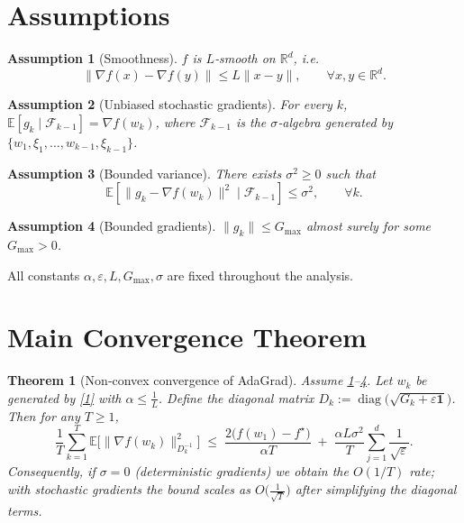 \documentclass{article}
\newtheorem{theorem}{Theorem}
\newtheorem{assumption}{Assumption}
\newcommand{\E}{\mathbb{E}}
\newcommand{\R}{\mathbb{R}}
\begin{document}
\newpage
\section*{Assumptions}
\begin{assumption}[Smoothness]\label{ass:smooth}
$f$ is $L$‑smooth on $\R^{d}$, i.e.
\[
\|\nabla f(x)-\nabla f(y)\| \le L\|x-y\|,\qquad\forall x,y\in\R^{d}.
\]
\end{assumption}
\begin{assumption}[Unbiased stochastic gradients]\label{ass:unbiased}
For every $k$, $\E[g_k\mid \mathcal{F}_{k-1}] = \nabla f(w_k)$, where $\mathcal{F}_{k-1}$ is the $\sigma$‑algebra generated by $\{w_1,\xi_1,\dots,w_{k-1},\xi_{k-1}\}$.
\end{assumption}
\begin{assumption}[Bounded variance]\label{ass:variance}
There exists $\sigma^2\ge0$ such that
\[
\E\!\left[\|g_k-\nabla f(w_k)\|^2\mid\mathcal{F}_{k-1}\right]\le\sigma^2,\qquad\forall k.
\]
\end{assumption}
\begin{assumption}[Bounded gradients]\label{ass:bounded}
$\|g_k\|\le G_{\max}$ almost surely for some $G_{\max}>0$.
\end{assumption}
All constants $\alpha,\varepsilon,L,G_{\max},\sigma$ are fixed throughout the analysis.

\section*{Main Convergence Theorem}
\begin{theorem}[Non‑convex convergence of AdaGrad]\label{thm:main}
Assume \ref{ass:smooth}–\ref{ass:bounded}. Let $w_{k}$ be generated by \eqref{1} with
$\alpha\le \frac{1}{L}$.
Define the diagonal matrix $D_k:=\operatorname{diag}\bigl(\sqrt{G_k+\varepsilon\mathbf 1}\bigr)$.
Then for any $T\ge1$,
\[
\frac{1}{T}\sum_{k=1}^{T}\E\!\bigl[\|\nabla f(w_k)\|_{D_k^{-1}}^{2}\bigr]
\;\le\;
\frac{2\bigl(f(w_1)-f^{\star}\bigr)}{\alpha T}
\;+\;
\frac{\alpha L\sigma^{2}}{T}\sum_{j=1}^{d}\frac{1}{\sqrt{\varepsilon}} .
\tag{2}
\]
Consequently, if $\sigma=0$ (deterministic gradients) we obtain the $O(1/T)$ rate; with stochastic gradients the bound scales as $O\bigl(\frac{1}{\sqrt{T}}\bigr)$ after simplifying the diagonal terms.
\end{theorem}
\end{document}
